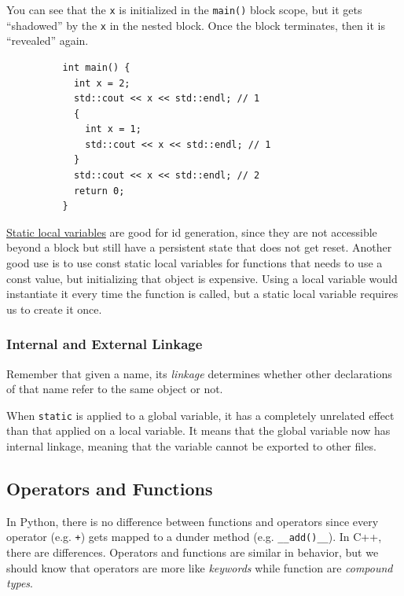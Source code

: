 \documentclass{article}
\newcounter{definition}[section]
\newcounter{example}[section]
\begin{document}
      \begin{example}
        \label{ex:variable-shadowing}
        You can see that the \texttt{x} is initialized in the \texttt{main()} block scope, but it gets ``shadowed'' by the \texttt{x} in the nested block. Once the block terminates, then it is ``revealed'' again. 

        \begin{lstlisting}
          int main() {  
            int x = 2; 
            std::cout << x << std::endl; // 1
            {
              int x = 1;
              std::cout << x << std::endl; // 1
            }
            std::cout << x << std::endl; // 2 
            return 0; 
          }
        \end{lstlisting}
      \end{example} 

      \hyperref[def:static-local-variables]{Static local variables} are good for id generation, since they are not accessible beyond a block but still have a persistent state that does not get reset. Another good use is to use const static local variables for functions that needs to use a const value, but initializing that object is expensive. Using a local variable would instantiate it every time the function is called, but a static local variable requires us to create it once. 

    \subsubsection{Internal and External Linkage} 

      Remember that given a name, its \textit{linkage} determines whether other declarations of that name refer to the same object or not. 

      \begin{definition}
        \label{def:static-global-variables}
        When \texttt{static} is applied to a global variable, it has a completely unrelated effect than that applied on a local variable. It means that the global variable now has internal linkage, meaning that the variable cannot be exported to other files. 
      \end{definition}

  \subsection{Operators and Functions} 

    In Python, there is no difference between functions and operators since every operator (e.g. \texttt{+}) gets mapped to a dunder method (e.g. \texttt{\_\_add()\_\_}). In C++, there are differences. Operators and functions are similar in behavior, but we should know that operators are more like \textit{keywords} while function are \textit{compound types}. 
    
\end{document}
